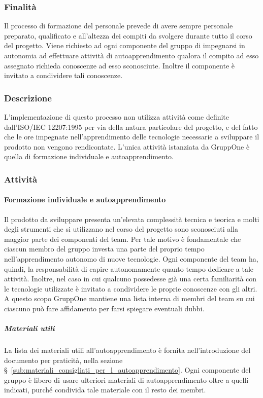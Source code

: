 \documentclass[../../norme-di-progetto.tex]{subfiles}
\begin{document}
\subsubsection{Finalità}%
\label{subs:formazione_del_personale/finalita}

Il processo di formazione del personale prevede di avere sempre personale preparato, qualificato e all'altezza dei compiti da svolgere durante tutto il corso del progetto.
Viene richiesto ad ogni componente del gruppo di impegnarsi in autonomia ad effettuare attività di autoapprendimento qualora il compito
ad esso assegnato richieda conoscenze ad esso sconosciute. Inoltre il componente è invitato a condividere tali conoscenze.

\subsubsection{Descrizione}%
\label{subs:formazione_del_personale/descrizione}

L'implementazione di questo processo non utilizza attività come definite dall'ISO/IEC 12207:1995 per via della natura particolare del progetto, e del fatto che le ore impegnate nell'apprendimento delle tecnologie necessarie a sviluppare il prodotto non vengono rendicontate.
L'unica attività istanziata da GruppOne è quella di formazione individuale e autoapprendimento.

\subsubsection{Attività}%
\label{subs:formazione_del_personale/attivita}

\paragraph{Formazione individuale e autoapprendimento}%
\label{par:formazione_individuale_e_autoapprendimento}

Il prodotto da sviluppare presenta un'elevata complessità tecnica e teorica e molti degli strumenti che si utilizzano nel corso del progetto sono sconosciuti alla maggior parte dei componenti del team.
Per tale motivo è fondamentale che ciascun membro del gruppo investa una parte del proprio tempo nell'apprendimento autonomo di nuove tecnologie.
Ogni componente del team ha, quindi, la responsabilità di capire autonomamente quanto tempo dedicare a tale attività.
Inoltre, nel caso in cui qualcuno possedesse già una certa familiarità con le tecnologie utilizzate è invitato a condividere le proprie conoscenze con gli altri. A questo scopo GruppOne mantiene una lista interna di membri del team su cui ciascuno può fare affidamento per farsi spiegare eventuali dubbi.

\subparagraph{Materiali utili}%
\label{subp:materiali_utili}

La lista dei materiali utili all'autoapprendimento è fornita nell'introduzione del documento per praticità, nella sezione §~\ref{sub:materiali_consigliati_per_l_autoapprendimento}.
Ogni componente del gruppo è libero di usare ulteriori materiali di autoapprendimento oltre a quelli indicati, purché condivida tale materiale con il resto dei membri.
\end{document}
